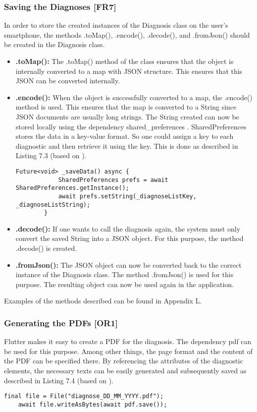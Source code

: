 \subsubsection{Saving the Diagnoses [FR7]}
In order to store the created instances of the Diagnosis class on the user's smartphone, the methods .toMap(), .encode(), .decode(), and .fromJson() should be created in the Diagnosis class.
\begin{itemize}
	\item \textbf{.toMap():}
	\newline
	The .toMap() method of the class ensures that the object is internally converted to a map with JSON structure. This ensures that this JSON can be converted internally.
	\item \textbf{.encode():}
	\newline
	When the object is successfully converted to a map, the .encode() method is used. This ensures that the map is converted to a String since JSON documents are usually long strings. 
	The String created can now be stored locally using the dependency shared\_preferences \cite{.sharedpref}. SharedPreferences stores the data in a key-value format. So one could assign a key to each diagnostic and then retrieve it using the key. This is done as described in Listing 7.3 (based on \cite{.usesharedpref}). 
	\scriptsize
	\begin{lstlisting}[caption=Storing Data to Locally with SharedPreferences]
		Future<void> _saveData() async {
			SharedPreferences prefs = await SharedPreferences.getInstance();
			await prefs.setString(_diagnoseListKey, _diagnoseListString);
		}
	\end{lstlisting}
	\normalsize
	\item \textbf{.decode():}
	\newline
	If one wants to call the diagnosis again, the system must only convert the saved String into a JSON object. For this purpose, the method .decode() is created. 
	\item \textbf{.fromJson():}
	\newline
	The JSON object can now be converted back to the correct instance of the Diagnosis class. The method .fromJson() is used for this purpose. The resulting object can now be used again in the application.
\end{itemize}
Examples of the methods described can be found in Appendix L.
\subsubsection{Generating the PDFs [OR1]}
Flutter makes it easy to create a PDF for the diagnosis. The dependency pdf can be used for this purpose. Among other things, the page format and the content of the PDF can be specified there. By referencing the attributes of the diagnostic elements, the necessary texts can be easily generated and subsequently saved as described in Listing 7.4 (based on \cite{.pdf}).
\scriptsize
\begin{lstlisting}[caption=Saving a PDF]
	final file = File("diagnose_DD_MM_YYYY.pdf");
	await file.writeAsBytes(await pdf.save());
\end{lstlisting}
\normalsize


